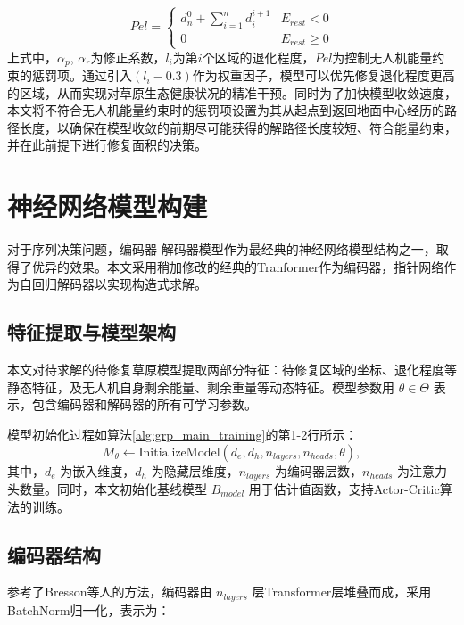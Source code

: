 \begin{equation}
	Pel=\left\{\begin{array}{ll}
		d_{n}^{0}+\sum\limits_{i=1}^{n}d_{i}^{i+1} & E_{rest}<0     \\
		0                                          & E_{rest}\geq 0
	\end{array}\right. 
	\label{eq:12}
\end{equation}
上式中，$\alpha_p$, $\alpha_r$为修正系数，$l_i$为第$i$个区域的退化程度，$Pel$为控制无人机能量约束的惩罚项。通过引入$(l_i-0.3)$作为权重因子，模型可以优先修复退化程度更高的区域，从而实现对草原生态健康状况的精准干预。同时为了加快模型收敛速度，本文将不符合无人机能量约束时的惩罚项设置为其从起点到返回地面中心经历的路径长度，以确保在模型收敛的前期尽可能获得的解路径长度较短、符合能量约束，并在此前提下进行修复面积的决策。

\section{神经网络模型构建}

对于序列决策问题，编码器-解码器模型\cite{vaswani2017attention}作为最经典的神经网络模型结构之一，取得了优异的效果。本文采用稍加修改的经典的Tranformer作为编码器，指针网络\cite{vinyals2015pointer}作为自回归解码器以实现构造式求解。

\subsection{特征提取与模型架构}

本文对待求解的待修复草原模型提取两部分特征：待修复区域的坐标、退化程度等静态特征，及无人机自身剩余能量、剩余重量等动态特征。模型参数用 $\theta \in \Theta$ 表示，包含编码器和解码器的所有可学习参数。

模型初始化过程如算法\ref{alg:grp_main_training}的第1-2行所示：
\begin{equation}
	M_{\theta} \leftarrow \text{InitializeModel}(d_e, d_h, n_{layers}, n_{heads}, \theta),
\end{equation}
其中，$d_e$ 为嵌入维度，$d_h$ 为隐藏层维度，$n_{layers}$ 为编码器层数，$n_{heads}$ 为注意力头数量。同时，本文初始化基线模型 $B_{model}$ 用于估计值函数，支持Actor-Critic算法的训练。

\subsection{编码器结构}

参考了Bresson\cite{bresson2021transformer}等人的方法，编码器由 $n_{layers}$ 层Transformer层堆叠而成，采用BatchNorm归一化，表示为：

